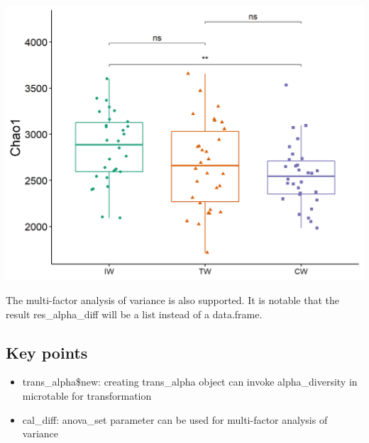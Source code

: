 \documentclass[
]{book}
\newenvironment{Shaded}{\begin{snugshade}}{\end{snugshade}}
\newcommand{\AttributeTok}[1]{\textcolor[rgb]{0.77,0.63,0.00}{#1}}
\newcommand{\CommentTok}[1]{\textcolor[rgb]{0.56,0.35,0.01}{\textit{#1}}}
\newcommand{\FunctionTok}[1]{\textcolor[rgb]{0.00,0.00,0.00}{#1}}
\newcommand{\NormalTok}[1]{#1}
\newcommand{\OtherTok}[1]{\textcolor[rgb]{0.56,0.35,0.01}{#1}}
\newcommand{\SpecialCharTok}[1]{\textcolor[rgb]{0.00,0.00,0.00}{#1}}
\newcommand{\StringTok}[1]{\textcolor[rgb]{0.31,0.60,0.02}{#1}}
\providecommand{\tightlist}{%
  \setlength{\itemsep}{0pt}\setlength{\parskip}{0pt}}
\begin{document}
\begin{center}\includegraphics[width=600px]{Images/plot_alpha} \end{center}

The multi-factor analysis of variance is also supported.
It is notable that the result res\_alpha\_diff will be a list instead of a data.frame.

\begin{Shaded}
\end{Shaded}

\hypertarget{key-points-3}{%
\subsection{Key points}\label{key-points-3}}

\begin{itemize}
\tightlist
\item
  trans\_alpha\$new: creating trans\_alpha object can invoke alpha\_diversity in microtable for transformation
\item
  cal\_diff: anova\_set parameter can be used for multi-factor analysis of variance
\end{itemize}
\end{document}
